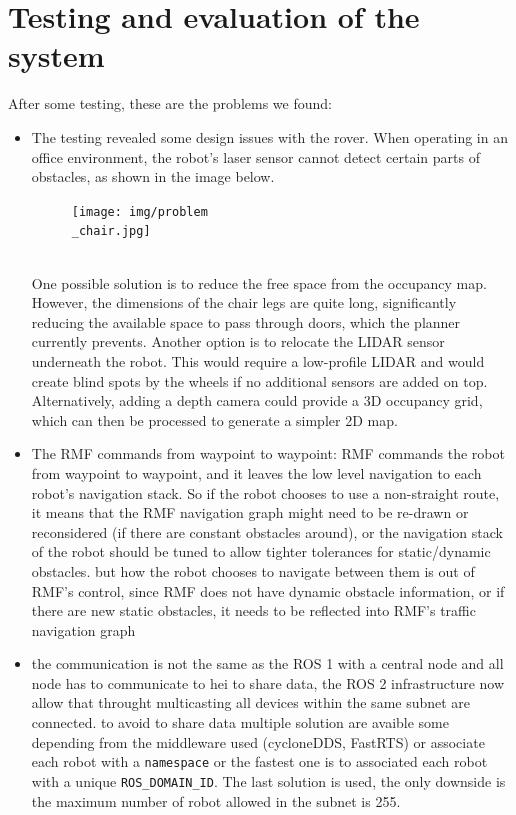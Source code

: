 \chapter{\alert{Testing and evaluation of the system}}
After some testing, these are the problems we found:
\begin{itemize}
\item The testing revealed some design issues with the rover. 
When operating in an office environment, the robot’s laser sensor cannot detect certain parts of obstacles, as shown in the image below.
\begin{figure}[h]
	\centering
	\texttt{[image: img/problem\\\_chair.jpg]}
\end{figure}\\
One possible solution is to reduce the free space from the occupancy map. However, the dimensions of the chair legs are quite long, significantly reducing the available space to pass through doors, which the planner currently prevents.
Another option is to relocate the LIDAR sensor underneath the robot. This would require a low-profile LIDAR and would create blind spots by the wheels if no additional sensors are added on top.
Alternatively, adding a depth camera could provide a 3D occupancy grid, which can then be processed to generate a simpler 2D map.
 
\item The RMF commands from waypoint to waypoint: RMF commands the robot from waypoint to waypoint, and it leaves the low level navigation to each robot's navigation stack. So if the robot chooses to use a non-straight route, it means that the RMF navigation graph might need to be re-drawn or reconsidered (if there are constant obstacles around), or the navigation stack of the robot should be tuned to allow tighter tolerances for static/dynamic obstacles. but how the robot chooses to navigate between them is out of RMF's control, since RMF does not have dynamic obstacle information, or if there are new static obstacles, it needs to be reflected into RMF's traffic navigation graph

\item \alert{the communication is not the same as the ROS 1 with a central node and all node has to communicate to hei to share data, the ROS 2 infrastructure now allow that throught multicasting all devices within the same subnet are connected. to avoid to share data multiple solution are avaible some depending from the middleware used (cycloneDDS, FastRTS) or associate each robot with a \texttt{namespace} or the fastest one is to associated each robot with a unique \texttt{ROS\_DOMAIN\_ID}. The last solution is used, the only downside is the maximum number of robot allowed in the subnet is 255.}


\end{itemize}
